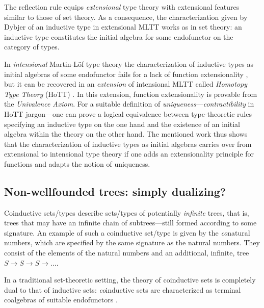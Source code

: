 \documentclass[a4paper,USenglish]{lipics}
\newcommand{\parencite}[1]{\cite{#1}}
\begin{document}
 
 The reflection rule equips \emph{extensional} type theory with extensional features similar to those of set theory.
 As a consequence, the characterization given by Dybjer \cite{DBLP:journals/tcs/Dybjer97} of an inductive type in extensional MLTT works as in set theory: 
 an inductive type constitutes the initial algebra for some endofunctor on the category of types.
  
 
 In \emph{intensional} Martin-Löf type theory the characterization of inductive types as initial algebras of some endofunctor fails 
  for a lack of function extensionality \parencite{DBLP:journals/tcs/Dybjer97}, 
  but it can be recovered \parencite{DBLP:conf/lics/AwodeyGS12} in an \emph{extension} of intensional MLTT called
  \emph{Homotopy Type Theory} (HoTT) \parencite{hottbook}.
  In this extension, function extensionality is provable from the \emph{Univalence Axiom}. 
 For a suitable definition of \emph{uniqueness}---\emph{contractibility} in HoTT jargon---one can prove 
 a logical equivalence between type-theoretic rules specifying an inductive type on the one hand and the existence of an initial algebra within the theory on the other hand.
 The mentioned work \parencite{DBLP:conf/lics/AwodeyGS12} thus shows that the characterization of inductive types as initial algebras carries over 
 from extensional to intensional type theory if one adds an extensionality principle for functions and adapts the notion of uniqueness.
 
 
 

 \subsection{Non-wellfounded trees: simply dualizing?}\label{sec:sem_coind}

  Coinductive sets/types describe sets/types of potentially \emph{infinite} trees, that is, trees that may have an infinite chain of subtrees---still formed according to some signature.
  An example of such a coinductive set/type is given by the \emph{co}natural numbers, which are specified by the same signature as the natural numbers.
  They consist of the elements of the natural numbers and an additional,
  infinite, tree $S \longrightarrow S\longrightarrow S \longrightarrow \ldots$. 
  
 In a traditional set-theoretic setting, the theory of coinductive sets is completely dual to that of inductive sets:
  \emph{co}inductive sets are characterized as terminal coalgebras of 
 suitable endofunctors \parencite{jacobs1997tutorial}.
 
\end{document}
